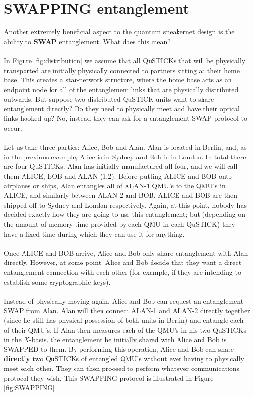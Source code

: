 \documentclass[aps,prl,twocolumn,10pt,nofootinbib]{revtex4}
\begin{document}
\section{SWAPPING entanglement}
Another extremely beneficial aspect to the quantum sneakernet design is the ability to {\bf SWAP} entanglement.  What does this mean?  
\\
\\
In Figure \ref{fig:distribution} we assume that all QuSTICKs that will be physically transported are initially physically connected to partners sitting at their home base.  This creates a star-network structure, where the home base acts as an endpoint node for all of the entanglement links that are physically distributed outwards.  But suppose two distributed QuSTICK units want to share entanglement directly?  Do they need to physically meet and have their optical links hooked up?  No, instead they can ask for a entanglement SWAP protocol to occur.  
\\
\\
Let us take three parties:  Alice, Bob and Alan.  Alan is located in Berlin, and, as in the previous example, Alice is in Sydney and Bob is in London.  In total there are four QuSTICKs.  Alan has initially manufactured all four, and we will call them ALICE, BOB and ALAN-(1,2).  Before putting ALICE and BOB onto airplanes or ships, Alan entangles all of ALAN-1 QMU's to the QMU's in ALICE, and similarly between ALAN-2 and BOB.  ALICE and BOB are then shipped off to Sydney and London respectively.  Again, at this point, nobody has decided exactly how they are going to use this entanglement; but (depending on the amount of memory time provided by each QMU in each QuSTICK) they have a fixed time during which they can use it for anything.  
\\
\\
Once ALICE and BOB arrive, Alice and Bob only share entanglement with Alan directly.  However, at some point, Alice and Bob decide that they want a direct entanglement connection with each other (for example, if they are intending to establish some cryptographic keys).
\\
\\
Instead of physically moving again, Alice and Bob can request an entanglement SWAP from Alan.  Alan will then connect ALAN-1 and ALAN-2 directly together (since he still has physical possession of both units in Berlin) and entangle each of their QMU's.  If Alan then measures each of the QMU's in his two QuSTICKs in the $X$-basis, the entanglement he initially shared with Alice and Bob is SWAPPED to them.  By performing this operation, Alice and Bob can share {\bf directly} two QuSTICKs of entangled QMU's without ever having to physically meet each other.  They can then proceed to perform whatever communications protocol they wish.  This SWAPPING protocol is illustrated in Figure \ref{fig:SWAPPING} 
\end{document}
